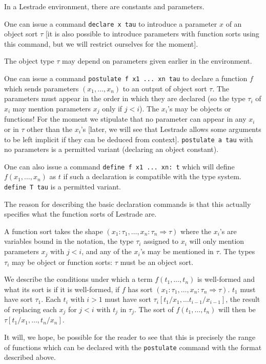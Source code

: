 \documentclass[12pt]{article}
\begin{document}
In a Lestrade environment, there are constants and parameters.

One can issue a command {\tt declare x tau} to introduce a parameter $x$ of an object sort $\tau$ [it is also possible to introduce parameters with function sorts using this command, but we will restrict ourselves for the moment].

The object type $\tau$ may depend on parameters given earlier in the environment.

One can issue a command {\tt postulate f x1 ... xn tau} to declare a function $f$ which sends parameters $(x_1,\ldots,x_n)$ to an output of object sort $\tau$.  The parameters must appear in the order in which they are declared
(so the type $\tau_i$ of $x_i$ may mention parameters $x_j$ only if $j<i$).  The $x_i$'s may be objects or functions!  For the moment we stipulate that no parameter can appear in any $x_i$ or in $\tau$ other than the $x_i$'s [later, we will see that Lestrade allows some arguments to be left implicit if they can be deduced from context].  {\tt postulate a tau} with no parameters is a permitted variant (declaring an object constant).

One can also issue a command {\tt define f x1 ... xn: t} which will define $f(x_1,\ldots,x_n)$ as $t$ if such a declaration is compatible with the type system.  {\tt define T tau} is a permitted variant.

The reason for describing the basic declaration commands is that this actually specifies what the function sorts of Lestrade are.

A function sort takes the shape $(x_1:\tau_1,\ldots,x_n:\tau_n \Rightarrow \tau)$ where the $x_i$'s are variables bound in the notation, the type $\tau_i$ assigned to $x_i$ will only mention parameters $x_j$ with $j<i$,
and any of the $x_i$'s may be mentioned in $\tau$.  The types $\tau_i$ may be object or function sorts:  $\tau$ must be an object sort.

We describe the conditions under which a term $f(t_1,\ldots,t_n)$ is well-formed and what its sort is if it is well-formed, if $f$ has sort $(x_1:\tau_1,\ldots,x_n:\tau_n \Rightarrow \tau)$.  $t_1$ must have sort
$\tau_1$.  Each $t_i$ with $i>1$ must have sort $\tau_i[t_1/x_1,\ldots t_{i-1}/x_{i-1}]$, the result of replacing each $x_j$ for $j<i$ with $t_j$ in $\tau_j$.  The sort of $f(t_1,\ldots,t_n)$ will then be $\tau[t_1/x_1,\ldots,t_n/x_n]$.

It will, we hope, be possible for the reader to see that this is precisely the range of functions which can be declared with the {\tt postulate} command with the format described above.
\end{document}

